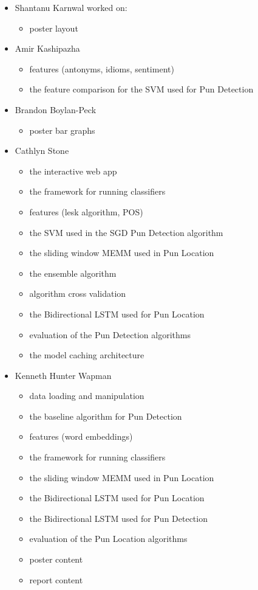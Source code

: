 \documentclass{article}
\begin{document}
\begin{itemize}
\item Shantanu Karnwal worked on:
	\begin{itemize}
		\item poster layout
	\end{itemize}
\item Amir Kashipazha
	\begin{itemize}
		\item features (antonyms, idioms, sentiment)
		\item the feature comparison for the SVM used for Pun Detection
	\end{itemize}
\item Brandon Boylan-Peck
	\begin{itemize}
		\item poster bar graphs
	\end{itemize}
\item Cathlyn Stone
	\begin{itemize}
		\item the interactive web app
		\item the framework for running classifiers
		\item features (lesk algorithm, POS)
		\item the SVM used in the SGD Pun Detection algorithm
		\item the sliding window MEMM used in Pun Location
		\item the ensemble algorithm
		\item algorithm cross validation
		\item the Bidirectional LSTM used for Pun Location
		\item evaluation of the Pun Detection algorithms
		\item the model caching architecture
	\end{itemize}
\item Kenneth Hunter Wapman
	\begin{itemize}
		\item data loading and manipulation
		\item the baseline algorithm for Pun Detection
		\item features (word embeddings)
		\item the framework for running classifiers
		\item the sliding window MEMM used in Pun Location
		\item the Bidirectional LSTM used for Pun Location
		\item the Bidirectional LSTM used for Pun Detection
		\item evaluation of the Pun Location algorithms
		\item poster content
		\item report content
	\end{itemize}
\end{itemize}
\end{document}
